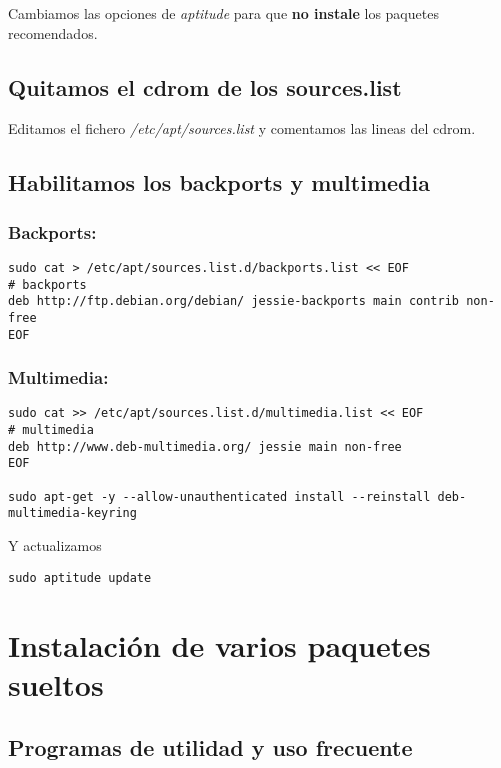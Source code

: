 \documentclass[12pt,spanish,]{article}
\begin{document}
Cambiamos las opciones de \emph{aptitude} para que \textbf{no instale}
los paquetes recomendados.

\subsection{Quitamos el cdrom de los
sources.list}\label{quitamos-el-cdrom-de-los-sources.list}

Editamos el fichero \emph{/etc/apt/sources.list} y comentamos las lineas
del cdrom.

\subsection{Habilitamos los backports y
multimedia}\label{habilitamos-los-backports-y-multimedia}

\subsubsection{Backports:}\label{backports}

\begin{verbatim}
sudo cat > /etc/apt/sources.list.d/backports.list << EOF
# backports
deb http://ftp.debian.org/debian/ jessie-backports main contrib non-free
EOF
\end{verbatim}

\subsubsection{Multimedia:}\label{multimedia}

\begin{verbatim}
sudo cat >> /etc/apt/sources.list.d/multimedia.list << EOF
# multimedia
deb http://www.deb-multimedia.org/ jessie main non-free
EOF

sudo apt-get -y --allow-unauthenticated install --reinstall deb-multimedia-keyring
\end{verbatim}

Y actualizamos

\begin{verbatim}
sudo aptitude update
\end{verbatim}

\section{Instalación de varios paquetes
sueltos}\label{instalaciuxf3n-de-varios-paquetes-sueltos}

\subsection{Programas de utilidad y uso
frecuente}\label{programas-de-utilidad-y-uso-frecuente}
\end{document}
